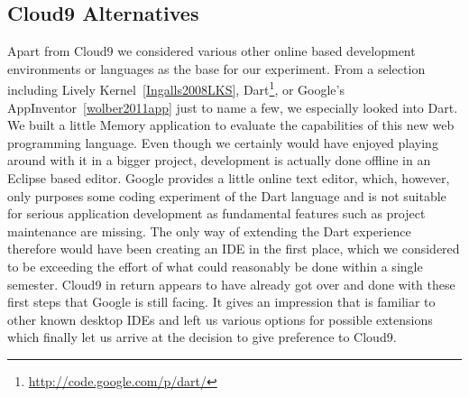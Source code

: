 \subsection{Cloud9 Alternatives}
Apart from Cloud9 we considered various other online based development environments or languages as the base for our experiment.
From a selection including Lively Kernel~\ref{Ingalls2008LKS},
Dart\footnote{\url{http://code.google.com/p/dart/}},
or Google's AppInventor~\ref{wolber2011app} just to name a few,
we especially looked into Dart.
We built a little Memory application to evaluate the capabilities of this new web programming language.
Even though we certainly would have enjoyed playing around with it in a bigger project,
development is actually done offline in an Eclipse based editor. Google provides a little online text editor, which,
however, only purposes some coding experiment of the Dart language and is not suitable for serious application development
as fundamental features such as project maintenance are missing. The only way of extending the Dart experience therefore
would have been creating an IDE in the first place, which we considered to be exceeding the effort of what could reasonably
be done within a single semester. Cloud9 in return appears to have already got over and done with these first steps that
Google is still facing. It gives an impression that is familiar to other known desktop IDEs and left us various options
for possible extensions which finally let us arrive at the decision to give preference to Cloud9.